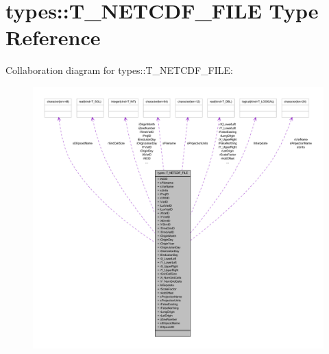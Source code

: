 \hypertarget{typetypes_1_1_t___n_e_t_c_d_f___f_i_l_e}{
\section{types::T\_\-NETCDF\_\-FILE Type Reference}
\label{typetypes_1_1_t___n_e_t_c_d_f___f_i_l_e}
}


Collaboration diagram for types::T\_\-NETCDF\_\-FILE:\nopagebreak
\begin{figure}[H]
\begin{center}
\leavevmode
\includegraphics[width=400pt]{typetypes_1_1_t___n_e_t_c_d_f___f_i_l_e__coll__graph}
\end{center}
\end{figure}
